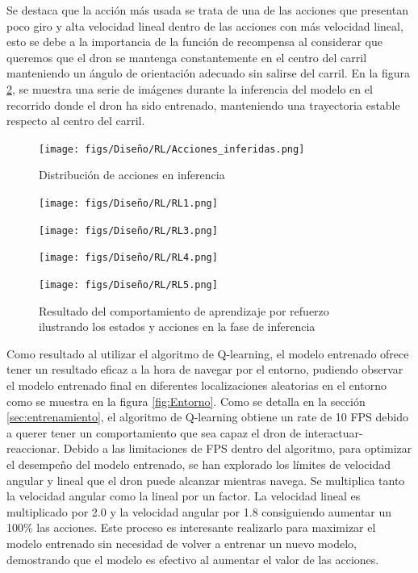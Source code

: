 Se destaca que la acción más usada se trata de una de las acciones que presentan poco giro y alta velocidad lineal dentro de las acciones con más velocidad lineal, esto se debe
a la importancia de la función de recompensa al considerar que queremos que el dron se mantenga constantemente en el centro del carril manteniendo un ángulo de orientación adecuado
sin salirse del carril. En la figura \ref{fig:inferencia-imagenes}, se muestra una serie de imágenes durante la inferencia del modelo en el recorrido donde el dron ha sido entrenado, manteniendo una trayectoria 
estable respecto al centro del carril.

\begin{figure} [H]
  \begin{center}
    \texttt{[image: figs/Diseño/RL/Acciones\_inferidas.png]}
  \end{center}
  \caption{Distribución de acciones en inferencia}
  \label{fig:Distribucción_inferencia}
\end{figure}

\begin{figure}[H]
  \centering
  \begin{minipage}{0.3\textwidth}
    \texttt{[image: figs/Diseño/RL/RL1.png]}
  \end{minipage}
  \hfill
  \begin{minipage}{0.3\textwidth}
    \texttt{[image: figs/Diseño/RL/RL3.png]}
  \end{minipage}
  \hfill
  \begin{minipage}{0.3\textwidth}
    \texttt{[image: figs/Diseño/RL/RL4.png]}
  \end{minipage}
  \hfill
  \begin{minipage}{0.3\textwidth}
    \texttt{[image: figs/Diseño/RL/RL5.png]}
  \end{minipage}
  \caption{Resultado del comportamiento de aprendizaje por refuerzo ilustrando los estados y acciones en la fase de inferencia}
  \label{fig:inferencia-imagenes}
\end{figure}

Como resultado al utilizar el algoritmo de Q-learning, el modelo entrenado ofrece tener un resultado eficaz a la hora de navegar por el entorno, pudiendo observar 
el modelo entrenado final en diferentes localizaciones aleatorias en el entorno como se muestra en la figura \ref{fig:Entorno}. Como se detalla en la sección \ref{sec:entrenamiento}, el algoritmo
de Q-learning obtiene un rate de 10 FPS debido a querer tener un comportamiento que sea capaz el dron de interactuar-reaccionar. Debido a las limitaciones de FPS dentro del algoritmo, para optimizar
el desempeño del modelo entrenado, se han explorado los límites de velocidad angular y lineal que el dron puede alcanzar mientras navega. Se multiplica tanto la velocidad angular como la lineal
por un factor. La velocidad lineal es multiplicado por 2.0 y la velocidad angular por 1.8 consiguiendo aumentar un 100\% las acciones. Este proceso es interesante realizarlo para 
maximizar el modelo entrenado sin necesidad de volver a entrenar un nuevo modelo, demostrando que el modelo es efectivo al aumentar el valor de las acciones. \newline

